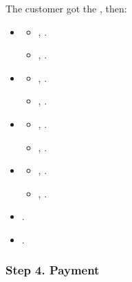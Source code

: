 \documentclass[pdftex,twocolumn,epjc3]{svjour3}
\begin{document}
{The customer got the \PoD, then:

\begin{itemize}
\item \AgreeablePath
  \begin{itemize}
    \item {}, .
    \item {}, .
  \end{itemize}
\item \DisputePath
  \begin{itemize}
    \item {}, \CustomerLosesBeforePayment{}.
    \item {}, .
  \end{itemize}
\end{itemize}

\ActedAbnormallyThen{\customer}

\begin{itemize}
\item \AgreeablePath
  \begin{itemize}
    \item {}, .
    \item {}, .
  \end{itemize}
\item \DisputePath
  \begin{itemize}
    \item {}, \CustomerLosesBeforePayment{}.
    \item {}, .
  \end{itemize}
\end{itemize}

\Fairness

\begin{itemize}
  \item {}.
  \item {}.
\end{itemize}



\subsubsection*{Step 4. \CustomerTurn{} Payment}

}
\end{document}
